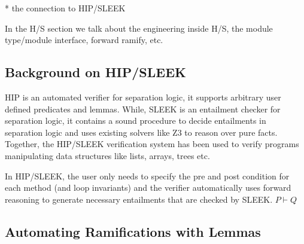 * the connection to HIP/SLEEK

In the H/S section we talk about the engineering inside H/S, the module type/module interface, forward ramify, etc.

\subsection{Background on HIP/SLEEK}
HIP is an automated verifier for separation logic, it supports arbitrary user defined predicates and lemmas. While, SLEEK
is an entailment checker for separation logic, it contains a sound  procedure to decide entailments in separation logic and uses existing solvers like Z3 to reason over pure facts. Together, the HIP/SLEEK verification system \cite{chin:hipsleek} has been used to verify programs manipulating data structures like lists, arrays, trees etc. 

In HIP/SLEEK, the user only needs to specify the pre and post condition for each method (and loop invariants) and the verifier automatically uses forward reasoning to generate necessary entailments that are checked by SLEEK.  $P \vdash Q$

\subsection{Automating Ramifications with Lemmas}
